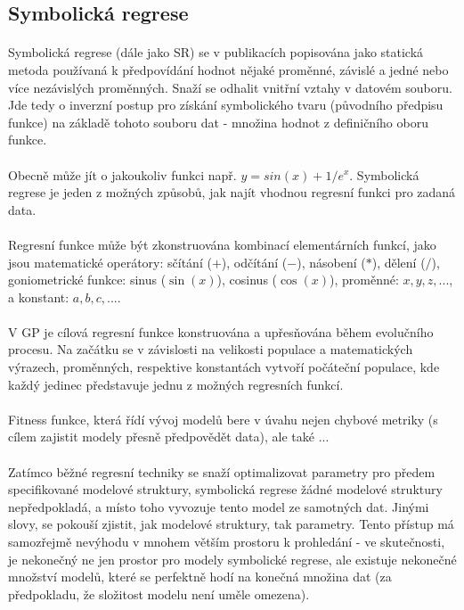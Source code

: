 \documentclass[bc,male,java,dept460]{diploma}		%
\begin{document}
\subsection{Symbolická regrese}
\paragraph*{}
Symbolická regrese (dále jako SR) se v publikacích popisována jako statická metoda používaná k předpovídání hodnot nějaké proměnné, závislé a jedné nebo více nezávislých proměnných. Snaží se odhalit vnitřní vztahy v datovém souboru. Jde tedy o inverzní postup pro získání symbolického tvaru (původního předpisu funkce) na základě tohoto souboru dat - množina hodnot z definičního oboru funkce. 

\paragraph*{}
Obecně může jít o jakoukoliv funkci např. $y=sin(x)+1/e^x$. Symbolická regrese je jeden z možných způsobů, jak najít vhodnou regresní funkci pro zadaná data.

\paragraph*{}
Regresní funkce může být zkonstruována kombinací elementárních funkcí, jako jsou matematické operátory: sčítání ($+$), odčítání ($-$), násobení ($*$), dělení ($/$), goniometrické funkce: sinus ($\sin(x)$), cosinus ($\cos(x)$), proměnné:  $x, y, z, ...$, a konstant: $a, b, c, ...$. 

\paragraph*{}
V GP je cílová regresní funkce konstruována a upřesňována během evolučního procesu. Na začátku se v závislosti na velikosti populace a matematických výrazech, proměnných, respektive konstantách vytvoří počáteční populace, kde každý jedinec představuje jednu z možných regresních funkcí.

\paragraph*{}
Fitness funkce, která řídí vývoj modelů bere v úvahu nejen chybové metriky (s cílem zajistit modely přesně předpovědět data), ale také ...

\paragraph*{}
Zatímco běžné regresní techniky se snaží optimalizovat parametry pro předem specifikované modelové struktury, symbolická regrese žádné modelové struktury nepředpokladá, a místo toho vyvozuje tento model ze samotných dat. Jinými slovy, se pokouší zjistit, jak modelové struktury, tak parametry. Tento přístup má samozřejmě nevýhodu v mnohem větším prostoru k prohledání - ve skutečnosti, je nekonečný ne jen prostor pro modely symbolické regrese, ale existuje nekonečné množství modelů, které se perfektně hodí na konečná množina dat (za předpokladu, že složitost modelu není uměle omezena). 
\end{document}
